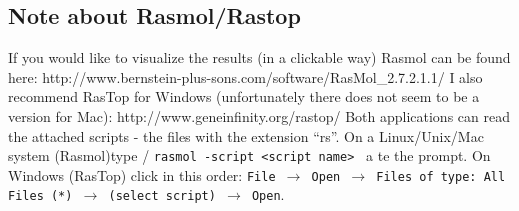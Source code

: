\subsection{Note about Rasmol/Rastop}
If you would like to visualize the results (in a clickable way) Rasmol can be found here:
http://www.bernstein-plus-sons.com/software/RasMol\_2.7.2.1.1/\newline
%
I also recommend RasTop  for Windows (unfortunately there
does not seem to be a version for Mac):
http://www.geneinfinity.org/rastop/\newline
%
%
Both applications can read the attached scripts - the files with the extension ``rs''.
On a Linux/Unix/Mac system (Rasmol)type /\newline
{\tt rasmol -script <script name> } \newline
a te the prompt. On Windows (RasTop) click in this order:  \newline
{\tt File $\rightarrow$ Open $\rightarrow$ Files of type: All Files (*)
$\rightarrow$ (select script) $\rightarrow$  Open}. \newline
